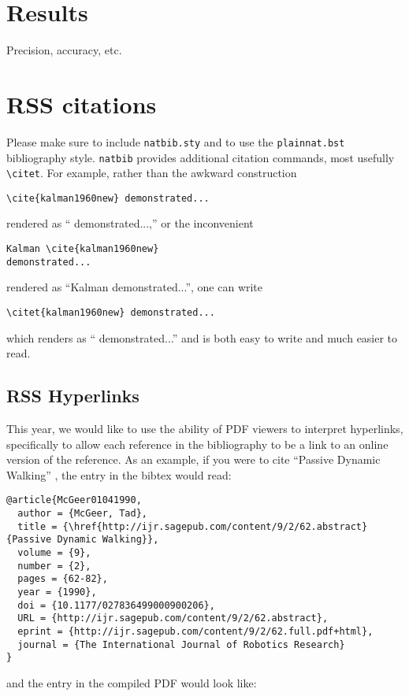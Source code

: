 \documentclass[conference]{IEEEtran}
\begin{document}
\section{Results}
 Precision, accuracy, etc.

\section{RSS citations}

Please make sure to include \verb!natbib.sty! and to use the
\verb!plainnat.bst! bibliography style. \verb!natbib! provides additional
citation commands, most usefully \verb!\citet!. For example, rather than the
awkward construction 

{\small
\begin{verbatim}
\cite{kalman1960new} demonstrated...
\end{verbatim}
}

\noindent
rendered as ``\cite{kalman1960new} demonstrated...,''
or the
inconvenient 

{\small
\begin{verbatim}
Kalman \cite{kalman1960new} 
demonstrated...
\end{verbatim}
}

\noindent
rendered as 
``Kalman \cite{kalman1960new} demonstrated...'', 
one can
write 

{\small
\begin{verbatim}
\citet{kalman1960new} demonstrated... 
\end{verbatim}
}
\noindent
which renders as ``\citet{kalman1960new} demonstrated...'' and is 
both easy to write and much easier to read.
  
\subsection{RSS Hyperlinks}

This year, we would like to use the ability of PDF viewers to interpret
hyperlinks, specifically to allow each reference in the bibliography to be a
link to an online version of the reference. 
As an example, if you were to cite ``Passive Dynamic Walking''
\cite{McGeer01041990}, the entry in the bibtex would read:

{\small
\begin{verbatim}
@article{McGeer01041990,
  author = {McGeer, Tad}, 
  title = {\href{http://ijr.sagepub.com/content/9/2/62.abstract}{Passive Dynamic Walking}}, 
  volume = {9}, 
  number = {2}, 
  pages = {62-82}, 
  year = {1990}, 
  doi = {10.1177/027836499000900206}, 
  URL = {http://ijr.sagepub.com/content/9/2/62.abstract}, 
  eprint = {http://ijr.sagepub.com/content/9/2/62.full.pdf+html}, 
  journal = {The International Journal of Robotics Research}
}
\end{verbatim}
}
\noindent
and the entry in the compiled PDF would look like:
\end{document}
